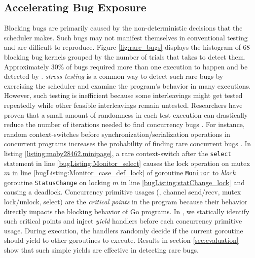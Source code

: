 \subsection{Accelerating Bug Exposure}
Blocking bugs are primarily caused by the non-deterministic decisions that the scheduler makes.
%
Such bugs may not manifest themselves in conventional testing and are difficult to reproduce.
%
Figure \ref{fig:rare_bugs} displays the histogram of 68 blocking bug kernels grouped by the number of trials that \goat takes to detect them.
%
Approximately 30\% of bugs required more than one execution to happen and be detected by \goat.
%
\textit{stress testing} is a common way to detect such rare bugs by exercising the scheduler and examine the program's behavior in many executions.
%
However, such testing is inefficient because some interleavings might get tested repeatedly while other feasible interleavings remain untested.
%
Researchers have proven that a small amount of randomness in each test execution can drastically reduce the number of iterations needed to find concurrency bugs \cite{emmi-delayBounded-popl11}.
%
For instance, random context-switches before synchronization/serialization operations in concurrent programs increases the probability of finding rare concurrent bugs \cite{burckhardt-depthBug-asplos10}.
%
In listing \ref{listing:moby28462.minipage}, a rare context-switch after the \texttt{select} statement in line \ref{bugListing:Monitor_select} causes the lock operation on mutex $m$ in line \ref{bugListing:Monitor_case_def_lock} of goroutine \texttt{Monitor} to \textit{block} goroutine \texttt{StatusChange} on locking $m$ in line \ref{bugListing:statChange_lock} and causing a deadlock.
%
Concurrency primitive usages (\eg, channel send/recv, mutex lock/unlock, select) are the \textit{critical points} in the program because their behavior directly impacts the blocking behavior of Go programs.
%
In \goat, we statically identify such critical points and inject \textit{yield} handlers before each concurrency primitive usage.
%
During execution, the handlers randomly decide if the current goroutine should yield to other goroutines to execute.
%
Results in section \ref{sec:evaluation} show that such simple yields are effective in detecting rare bugs.

